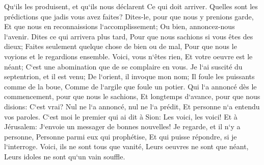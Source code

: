 \verse Qu`ils les produisent, et qu`ils nous déclarent Ce qui doit arriver. Quelles sont les prédictions que jadis vous avez faites? Dites-le, pour que nous y prenions garde, Et que nous en reconnaissions l`accomplissement; Ou bien, annoncez-nous l`avenir. 
\verse Dites ce qui arrivera plus tard, Pour que nous sachions si vous êtes des dieux; Faites seulement quelque chose de bien ou de mal, Pour que nous le voyions et le regardions ensemble. 
\verse Voici, vous n`êtes rien, Et votre oeuvre est le néant; C`est une abomination que de se complaire en vous. 
\verse Je l`ai suscité du septentrion, et il est venu; De l`orient, il invoque mon nom; Il foule les puissants comme de la boue, Comme de l`argile que foule un potier. 
\verse Qui l`a annoncé dès le commencement, pour que nous le sachions, Et longtemps d`avance, pour que nous disions: C`est vrai? Nul ne l`a annoncé, nul ne l`a prédit, Et personne n`a entendu vos paroles. 
\verse C`est moi le premier qui ai dit à Sion: Les voici, les voici! Et à Jérusalem: J`envoie un messager de bonnes nouvelles! 
\verse Je regarde, et il n`y a personne, Personne parmi eux qui prophétise, Et qui puisse répondre, si je l`interroge. 
\verse Voici, ils ne sont tous que vanité, Leurs oeuvres ne sont que néant, Leurs idoles ne sont qu`un vain souffle. 

